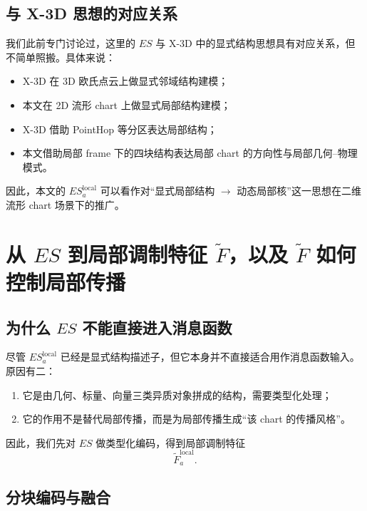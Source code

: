 \documentclass[12pt,a4paper]{ctexart}
\begin{document}
\subsection{与 X-3D 思想的对应关系}

我们此前专门讨论过，这里的 \(ES\) 与 X-3D 中的显式结构思想具有对应关系，但不简单照搬。具体来说：

\begin{itemize}[leftmargin=2em]
    \item X-3D 在 3D 欧氏点云上做显式邻域结构建模；
    \item 本文在 2D 流形 chart 上做显式局部结构建模；
    \item X-3D 借助 PointHop 等分区表达局部结构；
    \item 本文借助局部 frame 下的四块结构表达局部 chart 的方向性与局部几何--物理模式。
\end{itemize}

因此，本文的 \(ES_a^{\mathrm{local}}\) 可以看作对“显式局部结构 \(\to\) 动态局部核”这一思想在二维流形 chart 场景下的推广。

\section{从 \(ES\) 到局部调制特征 \(\tilde F\)，以及 \(\tilde F\) 如何控制局部传播}

\subsection{为什么 \(ES\) 不能直接进入消息函数}

尽管 \(ES_a^{\mathrm{local}}\) 已经是显式结构描述子，但它本身并不直接适合用作消息函数输入。原因有二：

\begin{enumerate}[leftmargin=2em]
    \item 它是由几何、标量、向量三类异质对象拼成的结构，需要类型化处理；
    \item 它的作用不是替代局部传播，而是为局部传播生成“该 chart 的传播风格”。
\end{enumerate}

因此，我们先对 \(ES\) 做类型化编码，得到局部调制特征
\[
\tilde F_a^{\mathrm{local}}.
\]

\subsection{分块编码与融合}
\end{document}
